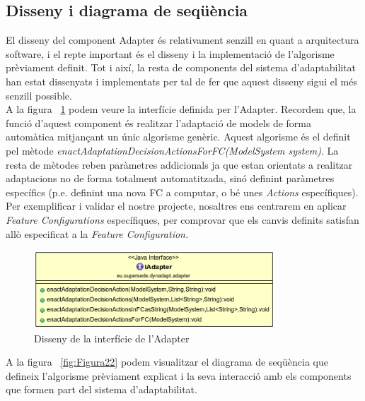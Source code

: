\subsection{Disseny i diagrama de seqüència}

El disseny del component Adapter és relativament senzill en quant a arquitectura software, i el repte important és el disseny i la implementació de l'algorisme prèviament definit. Tot i així, la resta de components del sistema d'adaptabilitat han estat dissenyats i implementats per tal de fer que aquest disseny sigui el més senzill possible.\\

A la figura ~\ref{fig:Figura26} podem veure la interfície definida per l'Adapter. Recordem que, la funció d'aquest component és realitzar l'adaptació de models de forma automàtica mitjançant un únic algorisme genèric. Aquest algorisme és el definit pel mètode \textit{enactAdaptationDecisionActionsForFC(ModelSystem system)}. La resta de mètodes reben paràmetres addicionals ja que estan orientats a realitzar adaptacions no de forma totalment automatitzada, sinó definint paràmetres específics (p.e. definint una nova FC a computar, o bé unes \textit{Actions} específiques). Per exemplificar i validar el nostre projecte, nosaltres ens centrarem en aplicar \textit{Feature Configurations} específiques, per comprovar que els canvis definits satisfan allò especificat a la \textit{Feature Configuration.}\\

\begin{figure}
\centering
\includegraphics[width=9cm]{Figures/Figure26}
\decoRule
\caption{Disseny de la interfície de l'Adapter}
\label{fig:Figura26}
\end{figure}

A la figura ~\ref{fig:Figura22} podem visualitzar el diagrama de seqüència que defineix l'algorisme prèviament explicat i la seva interacció amb els components que formen part del sistema d'adaptabilitat. 

